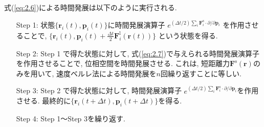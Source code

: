 式(\ref{eq:2.6})による時間発展は以下のように実行される. 
\begin{enumerate}
 \setlength{\leftskip}{0.4cm}
 \item[Step 1:]
 状態$\{\bm{r}_{i}(t), \bm{p}_{i}(t)\}$に時間発展演算子
 $e^{(\Delta t/2) \sum_{i} \bm{F}^{\mathrm{s}}_{i} \cdot \partial/\partial \bm{p}_{i}}$
 を作用させることで, 
 $\{\bm{r}_{i}(t), \bm{p}_{i}(t)+\frac{\Delta t}{2}\bm{F}_{i}^{\mathrm{l}}(\bm{r}(t))\}$
 という状態を得る. 
	      
 \item[Step 2:]
 Step 1 で得た状態に対して, 式(\ref{eq:2.7})で与えられる時間発展演算子を作用させることで, 位相空間を時間発展させる. 
 これは, 短距離力$\bm{F}^{\mathrm{s}}(\bm{r})$のみを用いて, 速度ベルレ法による時間発展を$n$回繰り返すことに等しい. 
	      
 \item[Step 3:]
  Step 2 で得た状態に対して, 時間発展演算子
  $e^{(\Delta t/2) \sum_{i} \bm{F}^{\mathrm{s}}_{i} \cdot \partial/\partial \bm{p}_{i}}$を作用させる. 
  最終的に$\{\bm{r}_{i}(t + \Delta t), \bm{p}_{i}(t + \Delta t)\}$を得る. 

 \item[Step 4:]
  Step 1〜Step 3を繰り返す. 
\end{enumerate}
 
